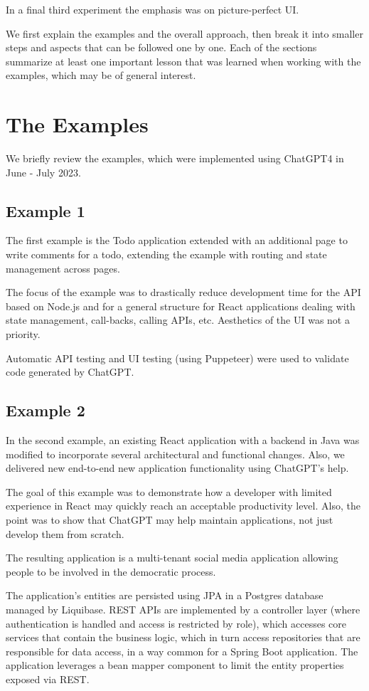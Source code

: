 \documentclass[runningheads]{llncs}
\begin{document}
In a final third experiment the emphasis was on picture-perfect UI.

We first explain the examples and the overall approach, then break it into smaller steps and aspects that can be followed one by one. Each of the sections summarize at least one important lesson that was learned when working with the examples, which may be of general interest.
%
\section{The Examples}
We briefly review the examples, which were implemented using ChatGPT4 in June - July 2023.

\subsection{Example 1}
The first example is the Todo application extended with an additional page to write comments for a todo, extending the example with routing and state management across pages. 

The focus of the example was to drastically reduce development time for the API based on Node.js and for a general structure for React applications dealing with state management, call-backs, calling APIs, etc. Aesthetics of the UI was not a priority. 

Automatic API testing and UI testing (using Puppeteer) were used to validate code generated by ChatGPT.

\subsection{Example 2}
In the second example, an existing React application with a backend in Java was modified to incorporate several architectural and functional changes. Also, we delivered new end-to-end new application functionality using ChatGPT's help. 

The goal of this example was to demonstrate how a developer with limited experience in React may quickly reach an acceptable productivity level. Also, the point was to show that ChatGPT may help maintain applications, not just develop them from scratch. 

The resulting application is a multi-tenant social media application allowing people to be involved in the democratic process. 

The application's entities are persisted using JPA in a Postgres database managed by Liquibase. REST APIs are implemented by a controller layer (where authentication is handled and access is restricted by role), which accesses core services that contain the business logic, which in turn access repositories that are responsible for data access, in a way common for a Spring Boot application. The application leverages a bean mapper component to limit the entity properties exposed via REST.
\end{document}
